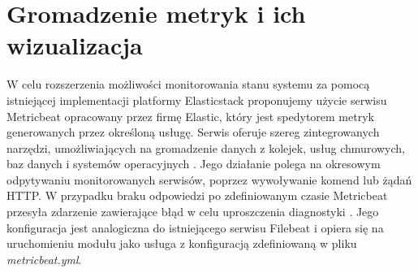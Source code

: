 \section{Gromadzenie metryk i ich wizualizacja}
W celu rozszerzenia możliwości monitorowania stanu systemu za pomocą istniejącej implementacji platformy Elasticstack proponujemy użycie serwisu Metricbeat opracowany przez firmę Elastic, który jest spedytorem metryk generowanych przez określoną usługę. Serwis oferuje szereg zintegrowanych narzędzi, umożliwiających na gromadzenie danych z kolejek, usług chmurowych, baz danych i systemów operacyjnych \cite{metricbeat}. Jego działanie polega na okresowym odpytywaniu monitorowanych serwisów, poprzez wywoływanie komend lub żądań HTTP. W przypadku braku odpowiedzi po zdefiniowanym czasie Metricbeat przesyła zdarzenie zawierające błąd w celu uproszczenia diagnostyki \cite{metricbeat_work}. Jego konfiguracja jest analogiczna do istniejącego serwisu Filebeat i opiera się na uruchomieniu modułu jako usługa z konfiguracją zdefiniowaną w pliku \textit{metricbeat.yml}.
